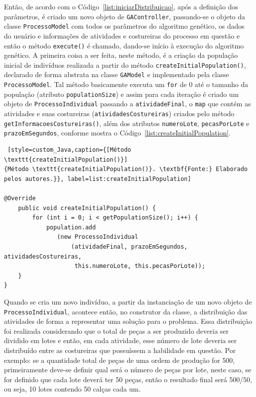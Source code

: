 \par Então, de acordo com o Código~\ref{list:iniciarDistribuicao}, após a definição dos parâmetros, é criado um novo objeto de \texttt{GAController}, passando-se o 
objeto da classe \texttt{ProcessoModel} com todos os parâmetros do algoritmo genético, os dados do usuário e 
informações de atividades e costureiras do processo em questão e então  o método \texttt{execute()} é chamado, dando-se início  
à execução do algoritmo genético. A primeira coisa a ser feita, neste método, é a criação da população inicial de indivíduos realizada a partir do método \texttt{createInitialPopulation()}, declarado de forma abstrata na classe \texttt{GAModel} e implementado pela classe 
\texttt{ProcessoModel}. Tal método basicamente executa um \texttt{for} de 0 até o tamanho da população (atributo 
\texttt{populationSize}) e assim para cada iteração é criado um objeto de \texttt{ProcessoIndividual} passando a 
\texttt{atividadeFinal}, o \texttt{map} que contém as atividades e suas costureiras (\texttt{atividadesCostureiras}) criados 
pelo método \texttt{getInformacoesCostureiras()}, além dos atributos \texttt{numeroLote}, \texttt{pecasPorLote} e
\texttt{prazoEmSegundos}, conforme mostra o Código~\ref{list:createInitialPopulation}.


\begin{lstlisting} [style=custom_Java,caption={[Método \texttt{createInitialPopulation()}]
{Método \texttt{createInitialPopulation()}. \textbf{Fonte:} Elaborado pelos autores.}}, label=list:createInitialPopulation]

@Override
	public void createInitialPopulation() {
		for (int i = 0; i < getPopulationSize(); i++) {
			population.add
			   (new ProcessoIndividual
			       (atividadeFinal, prazoEmSegundos, atividadesCostureiras,
			        this.numeroLote, this.pecasPorLote));
	}
}

\end{lstlisting}

\par Quando se cria um novo indivíduo, a partir da instanciação de um novo objeto de \texttt{ProcessoIndividual},
acontece então, no construtor da classe, a distribuição das atividades de forma a representar uma solução para o problema.
Essa distribuição foi realizada considerando que o total de
peças a ser produzido deveria ser dividido em lotes e então, em cada atividade,
esse número de lote deveria ser distribuído entre as costureiras que possuíssem a habilidade em questão. Por exemplo: se a quantidade total de peças de uma ordem de produção for 500,
primeiramente deve-se definir qual será o número de peças por lote, neste caso, se for definido que cada lote  
deverá ter 50 peças, então o resultado final será 500/50, ou seja, 10 lotes contendo 50 calças cada um. 

